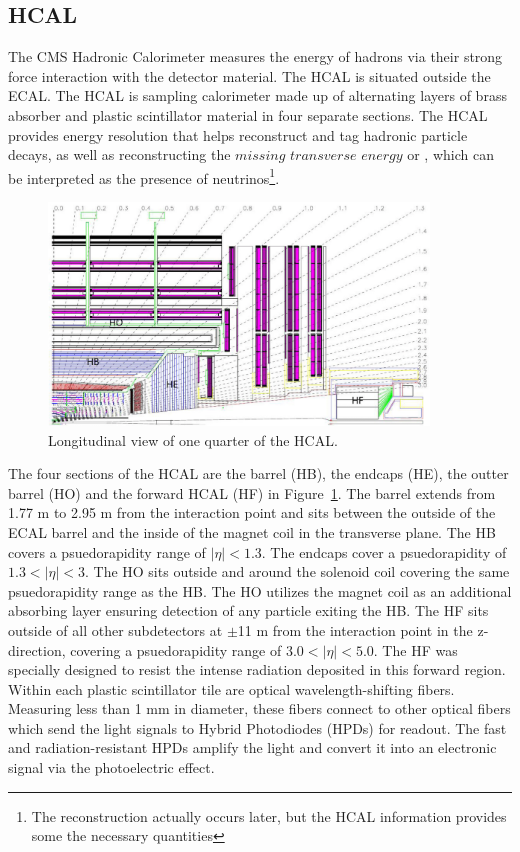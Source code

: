 \subsection{HCAL}
The CMS Hadronic Calorimeter measures the energy of hadrons via their strong force interaction with the detector material. The HCAL is situated outside the ECAL.
The HCAL is sampling calorimeter made up of alternating layers of brass absorber and plastic scintillator material in four separate sections. The HCAL provides energy resolution that helps reconstruct and tag hadronic
particle decays, as well as reconstructing the $missing$ $transverse$ $energy$ or \met, which can be interpreted as the presence of neutrinos\footnote{The \met reconstruction actually occurs later, but the HCAL information
provides some the necessary quantities}. 

\begin{figure}[hbtp]
 \begin{center}
   \includegraphics[width=0.9\textwidth]{ch3_figs/hcal.pdf}
   \caption[Longitudinal view of the CMS HCAL]{Longitudinal view of one quarter of the HCAL.}
   \label{fig:cms_hcal}
 \end{center}
\end{figure}

The four sections of the HCAL are the barrel (HB), the endcaps (HE), the outter barrel (HO) and the forward HCAL (HF) in Figure~\ref{fig:cms_hcal}. The barrel extends from 1.77 m to 2.95 m from the interaction point and
sits between the outside of the ECAL barrel and the inside of the magnet coil in the transverse plane. The HB covers a psuedorapidity range of $|\eta| < 1.3$.
The endcaps cover a psuedorapidity of $1.3 < |\eta| < 3$. The HO sits outside and around the solenoid coil covering the same psuedorapidity range
as the HB. The HO utilizes the magnet coil as an additional absorbing layer ensuring detection of any particle exiting the HB. The HF sits outside of all other subdetectors at $\pm$11 m from the interaction point in the z-direction,
covering a psuedorapidity range of $3.0 < |\eta| < 5.0$. The HF was specially designed to resist the intense radiation deposited in this forward region. Within each plastic scintillator tile are optical wavelength-shifting fibers.
Measuring less than 1 mm in diameter, these fibers connect to other optical fibers which send the light signals to Hybrid Photodiodes (HPDs) for readout. The fast and radiation-resistant HPDs amplify the light and convert it
into an electronic signal via the photoelectric effect.

